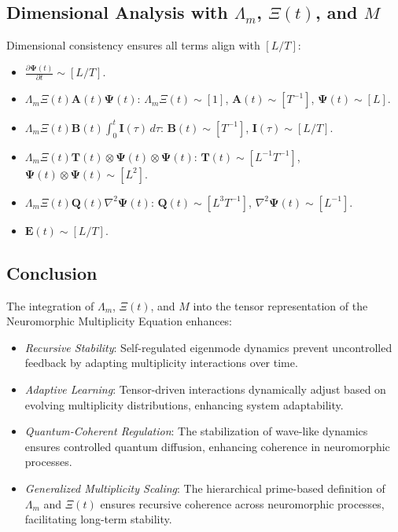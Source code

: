 \documentclass[12pt]{article}
\theoremstyle{plain}
\begin{document}
\subsection{Dimensional Analysis with \(\Lambda_m\), \(\Xi(t)\), and \(M\)}


Dimensional consistency ensures all terms align with \( [L/T] \):


\begin{itemize}
    \item \( \frac{\partial \bm{\Psi}(t)}{\partial t} \sim [L/T] \).
    \item \( \Lambda_m \Xi(t) \bm{A}(t) \bm{\Psi}(t) \): \( \Lambda_m \Xi(t) \sim [1] \), \( \bm{A}(t) \sim [T^{-1}] \), \( \bm{\Psi}(t) \sim [L] \).
    \item \( \Lambda_m \Xi(t) \bm{B}(t) \int_0^t \bm{I}(\tau) \, d\tau \): \( \bm{B}(t) \sim [T^{-1}] \), \( \bm{I}(\tau) \sim [L/T] \).
    \item \( \Lambda_m \Xi(t) \bm{T}(t) \otimes \bm{\Psi}(t) \otimes \bm{\Psi}(t) \): \( \bm{T}(t) \sim [L^{-1} T^{-1}] \), \( \bm{\Psi}(t) \otimes \bm{\Psi}(t) \sim [L^2] \).
    \item \( \Lambda_m \Xi(t) \bm{Q}(t) \nabla^2 \bm{\Psi}(t) \): \( \bm{Q}(t) \sim [L^3 T^{-1}] \), \( \nabla^2 \bm{\Psi}(t) \sim [L^{-1}] \).
    \item \( \bm{E}(t) \sim [L/T] \).
\end{itemize}


\subsection{Conclusion}


The integration of \(\Lambda_m\), \(\Xi(t)\), and \(M\) into the tensor representation of the Neuromorphic Multiplicity Equation enhances:


\begin{itemize}
    \item \textit{Recursive Stability}: Self-regulated eigenmode dynamics prevent uncontrolled feedback by adapting multiplicity interactions over time.
    \item \textit{Adaptive Learning}: Tensor-driven interactions dynamically adjust based on evolving multiplicity distributions, enhancing system adaptability.
    \item \textit{Quantum-Coherent Regulation}: The stabilization of wave-like dynamics ensures controlled quantum diffusion, enhancing coherence in neuromorphic processes.
    \item \textit{Generalized Multiplicity Scaling}: The hierarchical prime-based definition of \(\Lambda_m\) and \(\Xi(t)\) ensures recursive coherence across neuromorphic processes, facilitating long-term stability.
\end{itemize}
\end{document}
